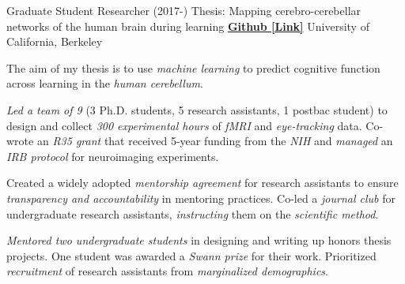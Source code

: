 

\begin{cventries}

  \cventry
    {Graduate Student Researcher (2017-)} %
    {Thesis: Mapping cerebro-cerebellar networks of the human brain during learning}
    {\href{https://github.com/maedbhk/cerebellum_learning_connect}{\textbf{Github [Link]}}}
    {University of California, Berkeley} %
    {
      \begin{cvitems} %
        \item {The aim of my thesis is to use \textit{machine learning} to predict cognitive function across learning in the \textit{human cerebellum}.} 
        \item {\textit{Led a team of 9} (3 Ph.D. students, 5 research assistants, 1 postbac student) to design and collect \textit{300 experimental hours} of \textit{fMRI} and \textit{eye-tracking} data. Co-wrote an \textit{R35 grant} that received 5-year funding from the \textit{NIH} and \textit{managed} an \textit{IRB protocol} for neuroimaging experiments.}
        \item {Created a widely adopted \textit{mentorship agreement} for research assistants to ensure \textit{transparency and accountability} in mentoring practices. Co-led a \textit{journal club} for undergraduate research assistants, \textit{instructing} them on the \textit{scientific method}.}
        \item {\textit{Mentored two undergraduate students} in designing and writing up honors thesis projects. One student was awarded a \textit{Swann prize} for their work. Prioritized \textit{recruitment} of research assistants from \textit{marginalized demographics}.}
      \end{cvitems}
    }
    

\end{cventries}
